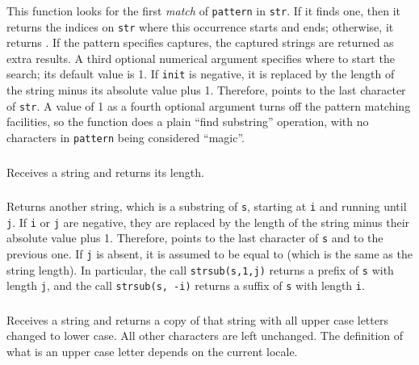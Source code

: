 \subsubsection*{\ff {}}
This function looks for the first \emph{match} of
\verb|pattern| in \verb|str|.
If it finds one, then it returns the indices on \verb|str|
where this occurrence starts and ends;
otherwise, it returns \nil.
If the pattern specifies captures,
the captured strings are returned as extra results.
A third optional numerical argument specifies where to start the search;
its default value is 1.
If \verb|init| is negative,
it is replaced by the length of the string minus its
absolute value plus 1.
Therefore,  points to the last character of \verb|str|.
A value of 1 as a fourth optional argument
turns off the pattern matching facilities,
so the function does a plain ``find substring'' operation,
with no characters in \verb|pattern| being considered ``magic''.

\subsubsection*{\ff {}}
Receives a string and returns its length.

\subsubsection*{\ff {}}
Returns another string, which is a substring of \verb|s|,
starting at \verb|i|  and running until \verb|j|.
If \verb|i| or \verb|j| are negative,
they are replaced by the length of the string minus their
absolute value plus 1.
Therefore,  points to the last character of \verb|s|
and  to the previous one.
If \verb|j| is absent, it is assumed to be equal to 
(which is the same as the string length).
In particular,
the call \verb|strsub(s,1,j)| returns a prefix of \verb|s|
with length \verb|j|,
and the call \verb|strsub(s, -i)| returns a suffix of \verb|s|
with length \verb|i|.

\subsubsection*{\ff {}}
Receives a string and returns a copy of that string with all
upper case letters changed to lower case.
All other characters are left unchanged.
The definition of what is an upper case
letter depends on the current locale.


